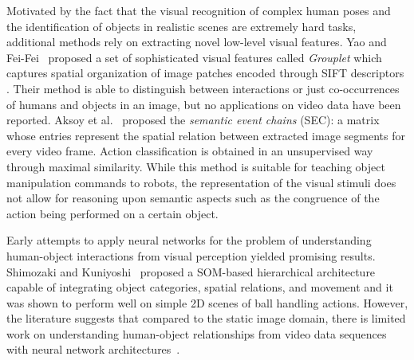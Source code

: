\documentclass[5p,times]{elsarticle}
\begin{document}
Motivated by the fact that the visual recognition of complex human poses and the identification of objects in realistic scenes are extremely hard tasks, additional methods rely on extracting novel low-level visual features. 
Yao and Fei-Fei~\citep{yao2010grouplet} proposed a set of sophisticated visual features called \textit{Grouplet} which captures spatial organization of image patches encoded through SIFT descriptors \citep{lowe2004distinctive}. 
Their method is able to distinguish between interactions or just co-occurrences of humans and objects in an image, but no applications on video data have been reported.
Aksoy et al.~\citep{aksoy2011learning} proposed the \textit{semantic event chains} (SEC): a matrix whose entries represent the spatial relation between extracted image segments for every video frame.
Action classification is obtained in an unsupervised way through maximal similarity.
While this method is suitable for teaching object manipulation commands to robots, the representation of the visual stimuli does not allow for reasoning upon semantic aspects such as the congruence of the action being performed on a certain object.

Early attempts to apply neural networks for the problem of understanding human-object interactions from visual perception yielded promising results.  
Shimozaki and Kuniyoshi~\cite{shimozaki2003integration} proposed a SOM-based hierarchical architecture capable of integrating object categories, spatial relations, and movement and it was shown to perform well on simple 2D scenes of ball handling actions.
However, the literature suggests that compared to the static image domain, there is limited work on understanding human-object relationships from video data sequences with neural network architectures~\cite{lea2016segmental, 2017arXiv171106330M}. 
\end{document}
